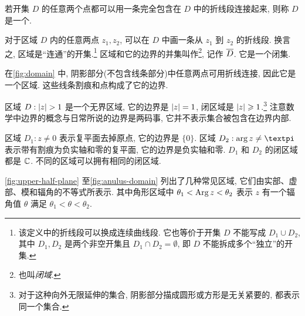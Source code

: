 \begin{definition}
  若开集 $D$ 的任意两个点都可以用一条完全包含在 $D$ 中的折线段连接起来, 则称 $D$ 是一个.
\end{definition}

对于区域 $D$ 内的任意两点 $z_1,z_2$, 可以在 $D$ 中画一条从 $z_1$ 到 $z_2$ 的折线段.
换言之, 区域是``连通''的开集.\footnote{
  该定义中的折线段可以换成连续曲线段.
  它也等价于开集 $D$ 不能写成 $D_1\cup D_2$, 其中 $D_1,D_2$ 是两个非空开集且 $D_1\cap D_2=\emptyset$, 即 $D$ 不能拆成多个``独立''的开集.
}
区域和它的边界的并集叫作\footnote{
  也叫\emph{闭域}.
}, 记作 $\overline D$.
它是一个闭集.


\begin{exampleenum}
  \item 在\ref{fig:domain} 中, 阴影部分(不包含线条部分)中任意两点可用折线连接, 因此它是一个区域.
  这些线条割痕和点构成了它的边界.
  \item 区域 $D:\lvert z\rvert>1$ 是一个无界区域, 它的边界是 $\lvert z\rvert=1$, 闭区域是 $\lvert z\rvert\geqslant 1$.\footnote{
    对于这种向外无限延伸的集合, 阴影部分描成圆形或方形是无关紧要的, 都表示同一个集合.
  }
  注意数学中边界的概念与日常所说的边界是两码事, 它并不表示集合被包含在边界内部. 
  \item 区域 $D_1:z\neq 0$ 表示复平面去掉原点, 它的边界是 $\{0\}$.
  区域 $D_2: \arg z\neq\cpi$ 表示带有割痕为负实轴和零的复平面, 它的边界是负实轴和零.
  $D_1$ 和 $D_2$ 的闭区域都是 ${\mathbb{C}}$.
  不同的区域可以拥有相同的闭区域.
  \item \ref{fig:upper-half-plane} 至\ref{fig:anulus-domain} 列出了几种常见区域, 它们由实部、虚部、模和辐角的不等式所表示.
  其中角形区域中 $\theta_1<\operatorname{Arg} z<\theta_2$ 表示 $z$ 有一个辐角值 $\theta$ 满足 $\theta_1<\theta<\theta_2$.
\end{exampleenum}

